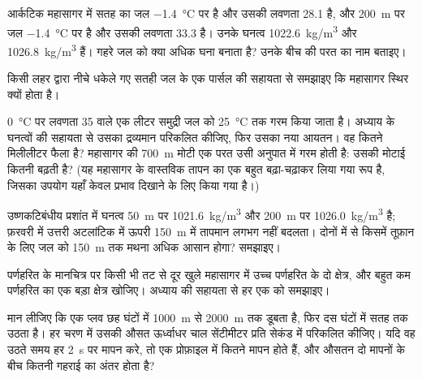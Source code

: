 \begin{exercise}[$\star\star$]\label{exo:g10:layered-ocean:10}
आर्कटिक महासागर में सतह का जल \qty{-1.4}{\degreeCelsius} पर है
और उसकी लवणता 28.1 है, और \qty{200}{m} पर जल \qty{-1.4}{\degreeCelsius} पर
है और उसकी लवणता 33.3 है। उनके घनत्व \qty{1022.6}{kg/m^3} और
\qty{1026.8}{kg/m^3} हैं। गहरे जल को क्या अधिक घना बनाता है? उनके बीच की परत का
नाम बताइए।
\end{exercise}

\begin{exercise}[$\star\star$]\label{exo:g10:layered-ocean:11}
किसी लहर द्वारा नीचे धकेले गए सतही जल के एक पार्सल की सहायता से समझाइए कि  महासागर
स्थिर क्यों होता है।
\end{exercise}

\begin{exercise}[$\star\star\star$]\label{exo:g10:layered-ocean:12}
\qty{0}{\degreeCelsius} पर लवणता 35 वाले एक लीटर समुद्री जल को
\qty{25}{\degreeCelsius} तक गरम किया जाता है। अध्याय के घनत्वों की सहायता से उसका
द्रव्यमान परिकलित कीजिए, फिर उसका नया आयतन। वह कितने मिलीलीटर फैला है?
महासागर की \qty{700}{m} मोटी एक परत उसी अनुपात में गरम होती है: उसकी
मोटाई कितनी बढ़ती है? (यह महासागर के वास्तविक तापन का एक बहुत बढ़ा-चढ़ाकर लिया गया रूप है,
जिसका उपयोग यहाँ केवल प्रभाव दिखाने के लिए किया गया है।)
\end{exercise}

\begin{exercise}[$\star\star\star$]\label{exo:g10:layered-ocean:13}
उष्णकटिबंधीय प्रशांत में घनत्व \qty{50}{m} पर \qty{1021.6}{kg/m^3}
और \qty{200}{m} पर \qty{1026.0}{kg/m^3} है; फ़रवरी में उत्तरी अटलांटिक में
ऊपरी \qty{150}{m} में तापमान लगभग नहीं बदलता। दोनों में से किसमें
तूफ़ान के लिए जल को \qty{150}{m} तक मथना अधिक आसान होगा? समझाइए।
\end{exercise}

\begin{exercise}[$\star\star\star$]\label{exo:g10:layered-ocean:14}
पर्णहरित के मानचित्र पर किसी भी तट से दूर खुले महासागर में उच्च पर्णहरित के दो क्षेत्र,
और बहुत कम पर्णहरित का एक बड़ा क्षेत्र खोजिए।
अध्याय की सहायता से हर एक को समझाइए।
\end{exercise}

\begin{exercise}[$\star\star\star$]\label{exo:g10:layered-ocean:15}
मान लीजिए कि एक प्लव छह घंटों में \qty{1000}{m} से \qty{2000}{m} तक डूबता है,
फिर दस घंटों में सतह तक उठता है। हर चरण में उसकी औसत ऊर्ध्वाधर चाल
सेंटीमीटर प्रति सेकंड में परिकलित कीजिए। यदि वह उठते समय हर \qty{2}{s} पर मापन करे,
तो एक प्रोफ़ाइल में कितने मापन होते हैं, और
औसतन दो मापनों के बीच कितनी गहराई का अंतर होता है?
\end{exercise}

